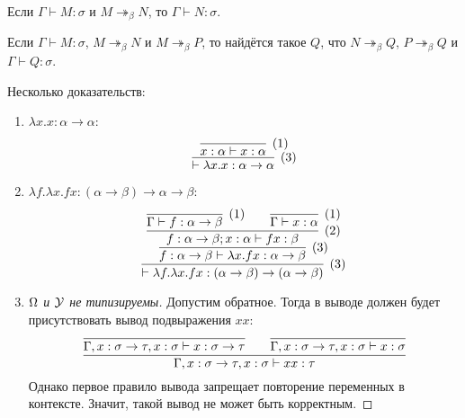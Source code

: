 \begin{corollary}
    Если $\Gamma \vdash M : \sigma$ и $M \twoheadrightarrow_{\beta}N$, то $\Gamma \vdash N : \sigma$.
\end{corollary}

\begin{theorem}
    Если $\Gamma \vdash M : \sigma$, $M \twoheadrightarrow_{\beta} N$ и $M \twoheadrightarrow_{\beta} P$, то найдётся такое $Q$, что
    $N \twoheadrightarrow_{\beta} Q$, $P \twoheadrightarrow_{\beta} Q$ и $\Gamma \vdash Q : \sigma$.
\end{theorem}

\begin{example} Несколько доказательств:
    \begin{enumerate}
        \item $\lambda x . x : \alpha \to \alpha$:
        \[
            \infer[(3)]
                {\vdash \lambda x . x : \alpha \to \alpha}
                { \infer[(1)]
                    {x : \alpha \vdash x : \alpha}
                    {}
                }
        \]

        \item $\lambda f . \lambda x . f x : (\alpha \to \beta) \to \alpha \to \beta$:
        \[
            \infer[(3)]
                { \vdash \lambda f . \lambda x . f x : (\alpha \to \beta) \to (\alpha \to \beta) }
                { \infer[(3)]
                    { f : \alpha \to \beta \vdash \lambda x . f x : \alpha \to \beta }
                    { \infer[(2)]
                        {f : \alpha \to \beta; x : \alpha \vdash f x : \beta}
                        {
                            \infer[(1)]{ \Gamma \vdash f : \alpha \to \beta }{} &&
                            \infer[(1)]{ \Gamma \vdash x : \alpha }{}
                        }
                    }
                }
        \]

        \item \begin{proof}[$\operatorname{\Omega}$ и $\operatorname{\mathcal{Y}}$ не типизируемы] Допустим обратное.
        Тогда в выводе должен будет присутствовать вывод подвыражения $xx$:
        \[
            \infer{\Gamma, x : \sigma \to \tau, x : \sigma \vdash x x : \tau}
            {  \infer{\Gamma, x : \sigma \to \tau, x : \sigma \vdash x : \sigma \to \tau}{}
            && \infer{\Gamma, x : \sigma \to \tau, x : \sigma \vdash x : \sigma}{}
            }
        \]
        Однако первое правило вывода запрещает повторение переменных в контексте. Значит, такой вывод не может быть корректным.
        \end{proof}

    \end{enumerate}
\end{example}

